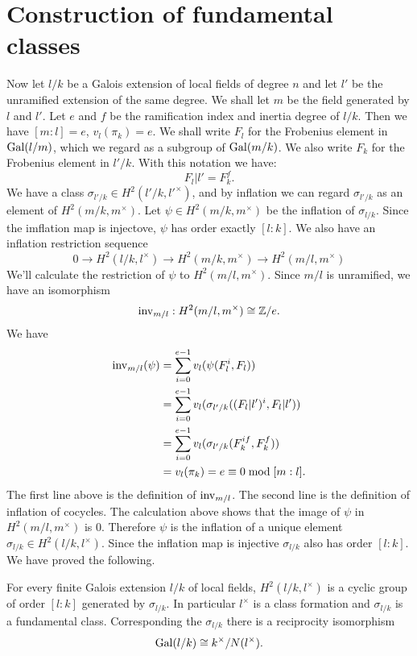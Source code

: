 \section{Construction of fundamental classes}

Now let $l/k$ be a Galois extension of local fields of degree $n$ and let $l'$ be
the unramified extension of the same degree.
We shall let $m$ be the field generated by $l$ and $l'$.
Let $e$ and $f$ be the ramification index and inertia degree of $l/k$.
Then we have $[m:l] = e$, $v_l(\pi_k)= e$.
We shall write $F_l$ for the Frobenius element in $\mathrm{Gal}(l/m)$, which we regard as a subgroup
of $\mathrm{Gal}(m/k)$. We also write $F_k$ for the Frobenius element in $l'/k$.
With this notation we have:
\[
	F_l|l' = F_k^f.
\]
We have a class $\sigma_{l'/k} \in H^2(l'/k,l'^\times)$, and by inflation we can regard
$\sigma_{l'/k}$ as an element of $H^2(m/k,m^\times)$.
Let $\psi\in H^2(m/k,m^\times)$ be the inflation of $\sigma_{l/k}$.
Since the imflation map is injectove, $\psi$ has order exactly $[l:k]$.
We also have an inflation restriction sequence
\[
	0 \to H^2(l/k, l^\times) \to H^2(m/k , m^\times) \to H^2(m/l, m^\times)
\]
We'll calculate the restriction of $\psi$ to $H^2(m/l, m^\times)$.
Since $m/l$ is unramified, we have an isomorphism
\[
	\mathrm{inv}_{m/l} : H^2(m/l, m^\times) \cong {\mathbb Z}/ e.
\]
We have
\begin{align*}
	\mathrm{inv}_{m/l}(\psi)
	&=\sum_{i=0}^{e-1} v_l (\psi (F_l^i,F_l))\\
	&=\sum_{i=0}^{e-1} v_l (\sigma_{l'/k}((F_l|l')^i,F_l|l'))\\
	&=\sum_{i=0}^{e-1} v_l (\sigma_{l'/k}(F_k^{if},F_k^f))\\
	&=v_l (\pi_k) = e \equiv 0 \bmod [m:l].
\end{align*}
The first line above is the definition of $\mathrm{inv}_{m/l}$.
The second line is the definition of inflation of cocycles.
The calculation above shows that the image of $\psi$ in $H^2(m/l, m^\times)$ is $0$.
Therefore $\psi$ is the inflation of a unique element $\sigma_{l/k} \in H^2(l/k,l^\times)$.
Since the inflation map is injective $\sigma_{l/k}$ also has order $[l:k]$.
We have proved the following.

\begin{theorem} \label{H2 local cyclic}
	For every finite Galois extension $l/k$ of local fields,
	$H^2(l/k,l^\times)$ is a cyclic group of order $[l:k]$ generated by $\sigma_{l/k}$.
	In particular $l^\times$ is a class formation and $\sigma_{l/k}$ is a fundamental class.
	Corresponding the $\sigma_{l/k}$ there is a reciprocity isomorphism
	\[
		\mathrm{Gal}(l/k) \cong k^\times / N(l^\times).
	\]
\end{theorem}
